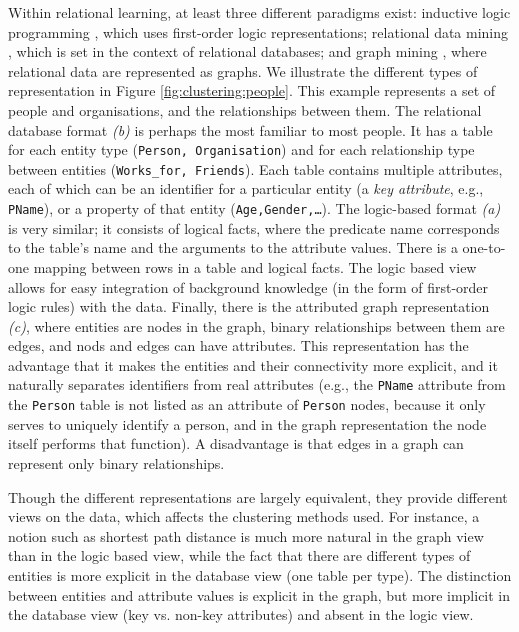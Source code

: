 Within relational learning, at least three different paradigms exist: inductive logic programming \cite{MuggletonR94}, which uses first-order logic representations; relational data mining \cite{DzeroskiB04}, which is set in the context of relational databases; and graph mining \cite{Cook2006}, where relational data are represented as graphs.
We illustrate the different types of representation in Figure \ref{fig:clustering:people}.
This example represents a set of people and organisations, and the relationships between them.
The relational database format \textit{(b)} is perhaps the most familiar to most people.
It has a table for each entity type (\texttt{Person, Organisation}) and for each relationship type between entities (\texttt{Works\_for, Friends}).
Each table contains multiple attributes, each of which can be an identifier for a particular entity (a \textit{key attribute}, e.g., \texttt{PName}), or a property of that entity (\texttt{Age,Gender,\ldots}).
The logic-based format \textit{(a)} is very similar; it consists of logical facts, where the predicate name corresponds to the table’s name and the arguments to the attribute values.
There is a one-to-one mapping between rows in a table and logical facts.
The logic based view allows for easy integration of background knowledge (in the form of first-order logic rules) with the data.
Finally, there is the attributed graph representation \textit{(c)}, where entities are nodes in the graph, binary relationships between them are edges, and nods and edges can have attributes.
This representation has the advantage that it makes the entities and their connectivity more explicit, and it naturally separates identifiers from real attributes (e.g., the \texttt{PName} attribute from the \texttt{Person} table is not listed as an attribute of \texttt{Person} nodes, because it only serves to uniquely identify a person, and in the graph representation the node itself performs that function).
A disadvantage is that edges in a graph can represent only binary relationships.


Though the different representations are largely equivalent, they provide different views on the data, which affects the clustering methods used.
For instance, a notion such as shortest path distance is much more natural in the graph view than in the logic based view, while the fact that there are  different types of entities is more explicit in the database view (one table per type).
The distinction between entities and attribute values is explicit in the graph, but more implicit in the database view (key vs. non-key attributes) and absent in the logic view.


